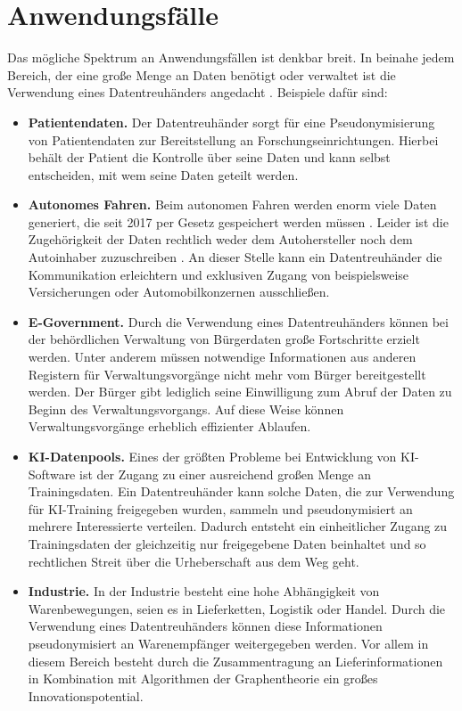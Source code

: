 \documentclass[
	fontsize=12pt,
	headings=small,
	parskip=half,           %
	bibliography=totoc,
	numbers=noenddot,       %
	open=any,               %
]{scrreprt}
\begin{document}
\section{Anwendungsfälle}
\label{sec:dt-usecases}
Das mögliche Spektrum an Anwendungsfällen ist denkbar breit. In beinahe jedem Bereich, der eine große Menge an Daten benötigt oder verwaltet ist die Verwendung eines Datentreuhänders angedacht \cite{dt-blankertz2021regulierung,dt-blankertz2021neue, dt-bundesdruckereiDatentreuhänder}. Beispiele dafür sind:
\begin{itemize}
    \item \textbf{Patientendaten.} Der Datentreuhänder sorgt für eine Pseudonymisierung von Patientendaten zur Bereitstellung an Forschungseinrichtungen. Hierbei behält der Patient die Kontrolle über seine Daten und kann selbst entscheiden, mit wem seine Daten geteilt werden.
    \item \textbf{Autonomes Fahren.} Beim autonomen Fahren werden enorm viele Daten generiert, die seit 2017 per Gesetz gespeichert werden müssen \cite{dt-bundesdruckereiDatentreuhänder}. Leider ist die Zugehörigkeit der Daten rechtlich weder dem Autohersteller noch dem Autoinhaber zuzuschreiben \cite{dt-richter2020ddvtalk}. An dieser Stelle kann ein Datentreuhänder die Kommunikation erleichtern und exklusiven Zugang von beispielsweise Versicherungen oder Automobilkonzernen ausschließen.
    \item \textbf{E-Government.} Durch die Verwendung eines Datentreuhänders können bei der behördlichen Verwaltung von Bürgerdaten große Fortschritte erzielt werden. Unter anderem müssen notwendige Informationen aus anderen Registern für Verwaltungsvorgänge nicht mehr vom Bürger bereitgestellt werden. Der Bürger gibt lediglich seine Einwilligung zum Abruf der Daten zu Beginn des Verwaltungsvorgangs. Auf diese Weise können Verwaltungsvorgänge erheblich effizienter Ablaufen.
    \item \textbf{KI-Datenpools.} Eines der größten Probleme bei Entwicklung von KI-Software ist der Zugang zu einer ausreichend großen Menge an Trainingsdaten. Ein Datentreuhänder kann solche Daten, die zur Verwendung für KI-Training freigegeben wurden, sammeln und pseudonymisiert an mehrere Interessierte verteilen. Dadurch entsteht ein einheitlicher Zugang zu Trainingsdaten der gleichzeitig nur freigegebene Daten beinhaltet und so rechtlichen Streit über die Urheberschaft aus dem Weg geht.
    \item \textbf{Industrie.} In der Industrie besteht eine hohe Abhängigkeit von Warenbewegungen, seien es in Lieferketten, Logistik oder Handel. Durch die Verwendung eines Datentreuhänders können diese Informationen pseudonymisiert an Warenempfänger weitergegeben werden. Vor allem in diesem Bereich besteht durch die Zusammentragung an Lieferinformationen in Kombination mit Algorithmen der Graphentheorie ein großes Innovationspotential.

\end{itemize}
\end{document}
